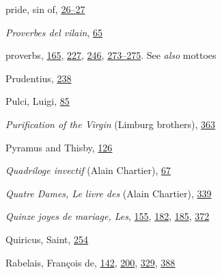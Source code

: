 pride, sin of,
\protect\hyperlink{08_Chapter_One__THE_PASSIONATE_INTE.xhtmlux5cux23page_26}{26--}\protect\hyperlink{08_Chapter_One__THE_PASSIONATE_INTE.xhtmlux5cux23page_27}{27}

\emph{Proverbes del vilain},
\protect\hyperlink{10_Chapter_Three__THE_HEROIC_DREAM.xhtmlux5cux23page_65}{65}

proverbs,
\protect\hyperlink{12_Chapter_Five__THE_VISION_OF_DEAT.xhtmlux5cux23page_165}{165},
\protect\hyperlink{15_Chapter_Eight__RELIGIOUS_EXCITAT.xhtmlux5cux23page_227}{227},
\protect\hyperlink{16_Chapter_Nine__THE_DECLINE_OF_SYM.xhtmlux5cux23page_246}{246},
\protect\hyperlink{18_Chapter_Eleven__THE_FORMS_OF_THO.xhtmlux5cux23page_273}{273--}\protect\hyperlink{18_Chapter_Eleven__THE_FORMS_OF_THO.xhtmlux5cux23page_275}{275}.
See \emph{also} mottoes

Prudentius,
\protect\hyperlink{16_Chapter_Nine__THE_DECLINE_OF_SYM.xhtmlux5cux23page_238}{238}

Pulci, Luigi,
\protect\hyperlink{10_Chapter_Three__THE_HEROIC_DREAM.xhtmlux5cux23page_85}{85}

\emph{Purification of the Virgin} (Limburg brothers),
\protect\hyperlink{21_Chapter_Thirteen__IMAGE_AND_WORD.xhtmlux5cux23page_363}{363}

Pyramus and Thisby,
\protect\hyperlink{11_Chapter_Four__THE_FORMS_OF_LOVE.xhtmlux5cux23page_126}{126}

\emph{Quadriloge invectif} (Alain Chartier),
\protect\hyperlink{10_Chapter_Three__THE_HEROIC_DREAM.xhtmlux5cux23page_67}{67}

\emph{Quatre Dames, Le livre des} (Alain Chartier),
\protect\hyperlink{21_Chapter_Thirteen__IMAGE_AND_WORD.xhtmlux5cux23page_339}{339}

\emph{Quinze joyes de mariage, Les},
\protect\hyperlink{11_Chapter_Four__THE_FORMS_OF_LOVE.xhtmlux5cux23page_155}{155},
\protect\hyperlink{13_Chapter_Six__THE_DEPICTION_OF_TH.xhtmlux5cux23page_182}{182},
\protect\hyperlink{13_Chapter_Six__THE_DEPICTION_OF_TH.xhtmlux5cux23page_185}{185},
\protect\hyperlink{21_Chapter_Thirteen__IMAGE_AND_WORD.xhtmlux5cux23page_372}{372}

Quiricus, Saint,
\protect\hyperlink{17_Chapter_Ten__THE_FAILURE_OF_IMAG.xhtmlux5cux23page_254}{254}

Rabelais, François de,
\protect\hyperlink{11_Chapter_Four__THE_FORMS_OF_LOVE.xhtmlux5cux23page_142}{142},
\protect\hyperlink{13_Chapter_Six__THE_DEPICTION_OF_TH.xhtmlux5cux23page_200}{200},
\protect\hyperlink{21_Chapter_Thirteen__IMAGE_AND_WORD.xhtmlux5cux23page_329}{329},
\protect\hyperlink{22_Chapter_Fourteen__THE_COMING_OF.xhtmlux5cux23page_388}{388}

